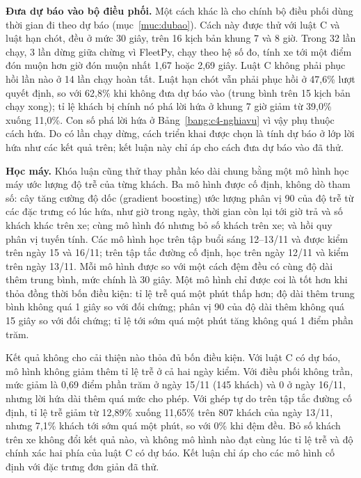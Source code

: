 \textbf{Đưa dự báo vào bộ điều phối.} Một cách khác là cho chính bộ điều phối dùng thời gian đi theo dự báo
(mục~\ref{muc:dubao}). Cách này được thử với luật C và luật hạn chót, đều ở mức 30 giây, trên 16 kịch bản khung 7
và 8 giờ. Trong 32 lần chạy, 3 lần dừng giữa chừng vì FleetPy, chạy theo hệ số đo, tính xe tới một điểm đón muộn hơn
giờ đón muộn nhất 1,67 hoặc 2,69 giây. Luật C không phải phục hồi lần nào ở 14 lần chạy hoàn tất. Luật hạn chót vẫn
phải phục hồi ở 47,6\% lượt quyết định, so với 62,8\% khi không đưa dự báo vào (trung bình trên 15 kịch bản chạy
xong); tỉ lệ khách bị chính nó phá lời hứa ở khung 7 giờ giảm từ 39,0\% xuống 11,0\%. Con số phá lời hứa ở
Bảng~\ref{bang:c4-nghiavu} vì vậy phụ thuộc cách hứa. Do có lần chạy dừng, cách triển khai được chọn là tính dự báo
ở lớp lời hứa như các kết quả trên; kết luận này chỉ áp cho cách đưa dự báo vào đã thử.

\textbf{Học máy.} Khóa luận cũng thử thay phần kéo dài chung bằng một mô hình học máy ước lượng độ trễ của từng
khách. Ba mô hình được cố định, không dò tham số: cây tăng cường độ dốc (gradient boosting) ước lượng phân vị 90 của
độ trễ từ các đặc trưng có lúc hứa, như giờ trong ngày, thời gian còn lại tới giờ trả và số khách khác trên xe; cùng
mô hình đó nhưng bỏ số khách trên xe; và hồi quy phân vị tuyến tính. Các mô hình học trên tập buổi sáng 12--13/11 và
được kiểm trên ngày 15 và 16/11; trên tập tắc đường cố định, học trên ngày 12/11 và kiểm trên ngày 13/11. Mỗi mô hình
được so với một cách đệm đều có cùng độ dài thêm trung bình, mức chính là 30 giây. Một mô hình chỉ được coi là tốt
hơn khi thỏa đồng thời bốn điều kiện: tỉ lệ trễ quá một phút thấp hơn; độ dài thêm trung bình không quá 1 giây so
với đối chứng; phân vị 90 của độ dài thêm không quá 15 giây so với đối chứng; tỉ lệ tới sớm quá một phút tăng không
quá 1 điểm phần trăm.

Kết quả không cho cải thiện nào thỏa đủ bốn điều kiện. Với luật C có dự báo, mô hình không giảm thêm tỉ lệ trễ ở cả
hai ngày kiểm. Với điều phối không trần, mức giảm là 0,69 điểm phần trăm ở ngày 15/11 (145 khách) và 0 ở ngày
16/11, nhưng lời hứa dài thêm quá mức cho phép. Với ghép tự do trên tập tắc đường cố định, tỉ lệ trễ giảm từ
12,89\% xuống 11,65\% trên 807 khách của ngày 13/11, nhưng 7,1\% khách tới sớm quá một phút, so với 0\% khi đệm
đều. Bỏ số khách trên xe không đổi kết quả nào, và không mô hình nào đạt cùng lúc tỉ lệ trễ và độ chính xác hai
phía của luật C có dự báo. Kết luận chỉ áp cho các mô hình cố định với đặc trưng đơn giản đã thử.

